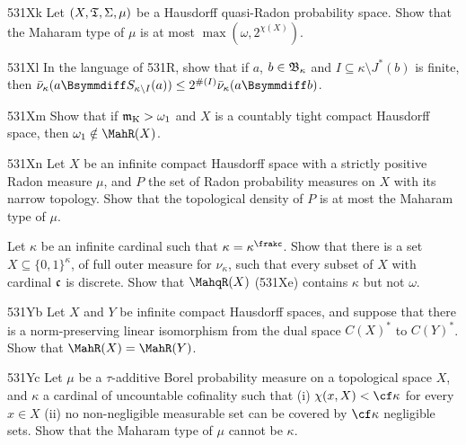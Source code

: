 {\spheader 531Xk Let $(X,\frak T,\Sigma,\mu)$ be a Hausdorff quasi-Radon
probability space.   Show that the Maharam type of $\mu$ is at most
$\max(\omega,2^{\chi(X)})$.   

\spheader 531Xl In the language of 531R, show that if $a$,
$b\in\frak B_{\kappa}$ and $I\subseteq\kappa\setminus J^*(b)$ is finite,
then $\bar\nu_{\kappa}(a\Bsymmdiff S_{\kappa\setminus I}(a))
\le 2^{\#(I)}\bar\nu_{\kappa}(a\Bsymmdiff b)$.

\spheader 531Xm Show that if $\frak m_{\text{K}}>\omega_1$ and $X$ is a
countably tight
compact Hausdorff space, then $\omega_1\notin\MahR(X)$.

\spheader 531Xn Let $X$ be an infinite
compact Hausdorff space with a strictly
positive Radon measure $\mu$, and $P$ the set of Radon probability measures
on $X$ with its narrow topology.   Show that the
topological density of $P$ is at most
the Maharam type of $\mu$.   

Let $\kappa$ be an infinite cardinal such that $\kappa=\kappa^{\frakc}$.
Show that there is a set $X\subseteq\{0,1\}^{\kappa}$, of full outer
measure for $\nu_{\kappa}$, such that every subset of $X$ with cardinal
$\frak c$ is discrete.   Show that $\MahqR(X)$ (531Xe) contains $\kappa$
but not $\omega$.

\spheader 531Yb
Let $X$ and $Y$ be infinite compact Hausdorff spaces, and suppose that
there is a norm-preserving linear isomorphism from the dual space
$C(X)^*$ to $C(Y)^*$.   Show that $\MahR(X)=\MahR(Y)$.

\spheader 531Yc Let $\mu$ be a
$\tau$-additive Borel probability measure on a topological
space $X$, and $\kappa$ a cardinal of uncountable cofinality such
that (i) $\chi(x,X)<\cf\kappa$ for every $x\in X$ (ii) no non-negligible
measurable set can be covered by $\cf\kappa$ negligible sets.   Show
that the Maharam type of $\mu$ cannot be $\kappa$.
}%

